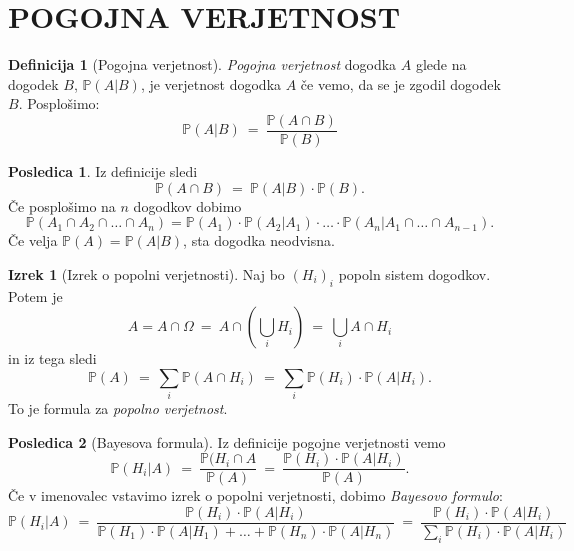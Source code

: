 \documentclass[11pt]{article}
\theoremstyle{definition}
\newtheorem{definicija}{Definicija}[section]
\theoremstyle{definition}
\theoremstyle{definition}
\newtheorem{izrek}{Izrek}[section]
\newtheorem*{posledica}{Posledica}
\begin{document}
\pagebreak


\section{POGOJNA VERJETNOST}
\vspace{0.5cm}

\begin{definicija}[Pogojna verjetnost]

\textit{Pogojna verjetnost} dogodka $A$ glede na dogodek $B$, $\mathbb{P}(A | B)$, je verjetnost dogodka $A$ če vemo, da se je zgodil dogodek $B$.
Posplošimo:
$$\mathbb{P}(A | B) ~=~ \frac{\mathbb{P}(A \cap B)}{\mathbb{P}(B)}$$

\end{definicija}
\vspace{0.5cm}

\begin{posledica}

Iz definicije sledi
$$\mathbb{P}(A \cap B) ~=~ \mathbb{P}(A | B) \cdot \mathbb{P}(B).$$
Če posplošimo na $n$ dogodkov dobimo
$$\mathbb{P}(A_1 \cap A_2 \cap \ldots \cap A_n) = \mathbb{P}(A_1) \cdot \mathbb{P}(A_2 | A_1) \cdot \ldots \cdot \mathbb{P}(A_n | A_1 \cap \ldots \cap A_{n-1}).$$
Če velja $\mathbb{P}(A) = \mathbb{P}(A | B)$, sta dogodka neodvisna.

\end{posledica}
\vspace{0.5cm}

\begin{izrek}[Izrek o popolni verjetnosti]

Naj bo $(H_i)_i$ popoln sistem dogodkov. Potem je 
$$A = A \cap \Omega ~=~ A \cap {\left( \bigcup_i H_i \right)} ~=~ \bigcup_i A \cap H_i$$
in iz tega sledi
$$\mathbb{P}(A) ~=~ \sum_i \mathbb{P}(A \cap H_i) ~=~ \sum_i \mathbb{P}(H_i) \cdot \mathbb{P}(A | H_i).$$
To je formula za \textit{popolno verjetnost}.

\end{izrek}
\vspace{0.5cm}

\begin{posledica}[Bayesova formula]

Iz definicije pogojne verjetnosti vemo
$$\mathbb{P}(H_i | A) ~=~ \frac{\mathbb{P}(H_i \cap A}{\mathbb{P}(A)} ~=~ \frac{\mathbb{P}(H_i) \cdot \mathbb{P}(A | H_i)}{\mathbb{P}(A)}.$$
Če v imenovalec vstavimo izrek o popolni verjetnosti, dobimo \textit{Bayesovo formulo}:
$$\mathbb{P}(H_i | A) ~=~ \frac{\mathbb{P}(H_i) \cdot \mathbb{P}(A | H_i)}{\mathbb{P}(H_1) \cdot \mathbb{P}(A | H_1) + \ldots + \mathbb{P}(H_n) \cdot \mathbb{P}(A | H_n)} ~=~ \frac{\mathbb{P}(H_i) \cdot \mathbb{P}(A | H_i)}{\sum_i \mathbb{P}(H_i) \cdot \mathbb{P}(A | H_i)}$$

\end{posledica}
\vspace{0.5cm}
\end{document}
